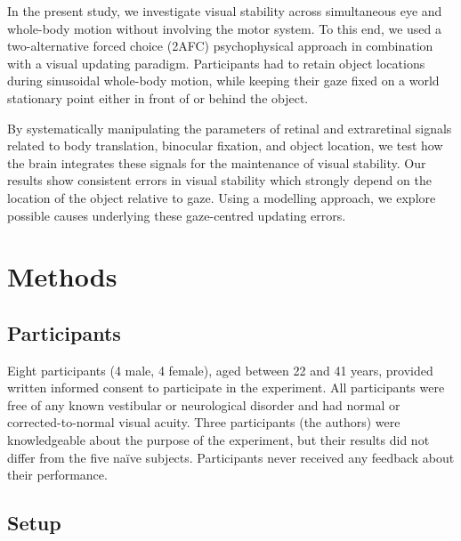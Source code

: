 In the present study, we investigate visual stability across simultaneous eye and whole-body motion without involving the motor system. To this end, we used a two-alternative forced choice (2AFC) psychophysical approach in combination with a visual updating paradigm. Participants had to retain object locations during sinusoidal whole-body motion, while keeping their gaze fixed on a world stationary point either in front of or behind the object.

By systematically manipulating the parameters of retinal and extraretinal signals related to body translation, binocular fixation, and object location, we test how the brain integrates these signals for the maintenance of visual stability. Our results show consistent errors in visual stability which strongly depend on the location of the object relative to gaze. Using a modelling approach, we explore possible causes underlying these gaze-centred updating errors.


\section{Methods}
\label{p2:sec:methods}

\subsection{Participants}

Eight participants (4 male, 4 female), aged between 22 and 41 years, provided written informed consent to participate in the experiment. All participants were free of any known vestibular or neurological disorder and had normal or corrected-to-normal visual acuity. Three participants (the authors) were knowledgeable about the purpose of the experiment, but their results did not differ from the five na\"ive subjects. Participants never received any feedback about their performance.

\subsection{Setup}

